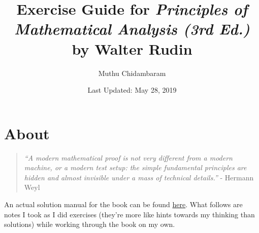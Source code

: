 \documentclass{article}
\begin{document}
\title{Exercise Guide for \textit{Principles of Mathematical Analysis (3rd Ed.)} by Walter Rudin}
\author{Muthu Chidambaram}
\date{Last Updated: May 28, 2019} 

\maketitle

\tableofcontents
\newpage 

\section*{About}

\begin{quote}
        \textit{``A modern mathematical proof is not very different from a modern machine,
or a modern test setup: the simple fundamental principles are hidden 
and almost invisible under a mass of technical details.''} - Hermann Weyl
\end{quote}

An actual solution manual for the book can be found \href{https://minds.wisconsin.edu/handle/1793/67009}{here}.
What follows are notes I took as I did exercises (they're more like hints towards my thinking than
solutions) while working through the book on my own. 






\end{document}
